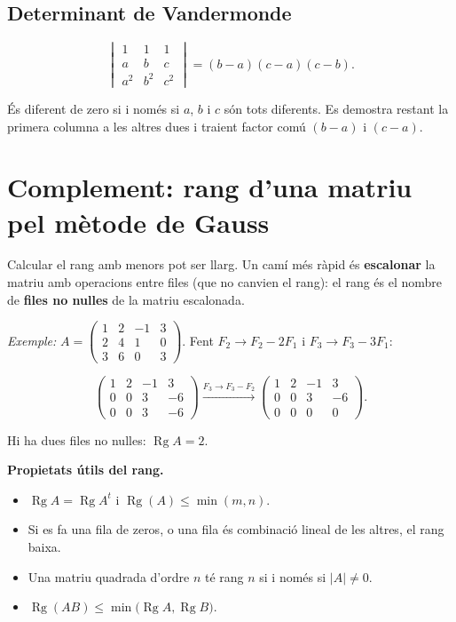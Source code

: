 \subsection{Determinant de Vandermonde}

\begin{equation*}
\begin{vmatrix}1&1&1\\a&b&c\\a^{2}&b^{2}&c^{2}\end{vmatrix}=(b-a)(c-a)(c-b).
\end{equation*}

És diferent de zero si i només si $a$, $b$ i $c$ són tots diferents. Es demostra restant la primera columna a les altres dues i traient factor comú $(b-a)$ i $(c-a)$.

\section{Complement: rang d'una matriu pel mètode de Gauss}

Calcular el rang amb menors pot ser llarg. Un camí més ràpid és \textbf{escalonar} la matriu amb operacions entre files (que no canvien el rang): el rang és el nombre de \textbf{files no nul\textperiodcentered{}les} de la matriu escalonada.

\emph{Exemple:} $A=\begin{pmatrix}1&2&-1&3\\2&4&1&0\\3&6&0&3\end{pmatrix}$. Fent $F_2\to F_2-2F_1$ i $F_3\to F_3-3F_1$:

\begin{equation*}
\begin{pmatrix}1&2&-1&3\\0&0&3&-6\\0&0&3&-6\end{pmatrix}\xrightarrow{F_3\to F_3-F_2}\begin{pmatrix}1&2&-1&3\\0&0&3&-6\\0&0&0&0\end{pmatrix}.
\end{equation*}

Hi ha dues files no nul\textperiodcentered{}les: $\operatorname{Rg}A=2$.

\textbf{Propietats útils del rang.}

\begin{itemize}
\item $\operatorname{Rg}A=\operatorname{Rg}A^{t}$ i $\operatorname{Rg}(A)\le\min(m,n)$.
\item Si es fa una fila de zeros, o una fila és combinació lineal de les altres, el rang baixa.
\item Una matriu quadrada d'ordre $n$ té rang $n$ si i només si $|A|\neq0$.
\item $\operatorname{Rg}(AB)\le\min\bigl(\operatorname{Rg}A,\operatorname{Rg}B\bigr)$.
\end{itemize}

